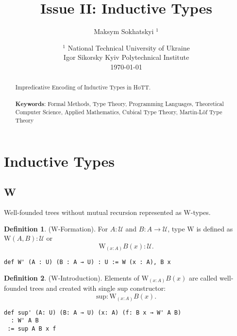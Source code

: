 \documentclass{article}
\theoremstyle{definition}
\newtheorem{definition}{Definition}
\begin{document}
\title{Issue II: Inductive Types}
\author{Maksym Sokhatskyi $^1$}
\date{ $^1$ National Technical University of Ukraine \\
       \small Igor Sikorsky Kyiv Polytechnical Institute \\
       \today }

\maketitle

\begin{abstract}

Impredicative Encoding of Inductive Types in HoTT.
\\
\\
{\bf Keywords}: Formal Methods, Type Theory, Programming Languages,
          Theoretical Computer Science, Applied Mathematics,
          Cubical Type Theory, Martin-Löf Type Theory
\end{abstract}

\tableofcontents
\newpage

\section{Inductive Types}

\subsection{W}

Well-founded trees without mutual recursion represented as $\mathrm{W}$-types.

\begin{definition} ($\mathrm{W}$-Formation).
For $A : \mathcal{U}$ and $B : A \rightarrow \mathcal{U}$, type $\mathrm{W}$
is defined as $\mathrm{W}(A,B) : \mathcal{U}$ or
$$
   \mathrm{W}_{(x : A)} B(x) : \mathcal{U}.
$$
\begin{lstlisting}
def W' (A : U) (B : A → U) : U := W (x : A), B x
\end{lstlisting}
\end{definition}

\begin{definition} ($\mathrm{W}$-Introduction).
Elements of $\mathrm{W}_{(x : A)} B(x)$ are called
well-founded trees and created with single $\mathrm{sup}$ constructor:
$$
  \mathrm{sup} : \mathrm{W}_{(x: A)} B(x).
$$
\begin{lstlisting}
def sup' (A: U) (B: A → U) (x: A) (f: B x → W' A B)
  : W' A B
 := sup A B x f
\end{lstlisting}
\end{definition}
\end{document}
